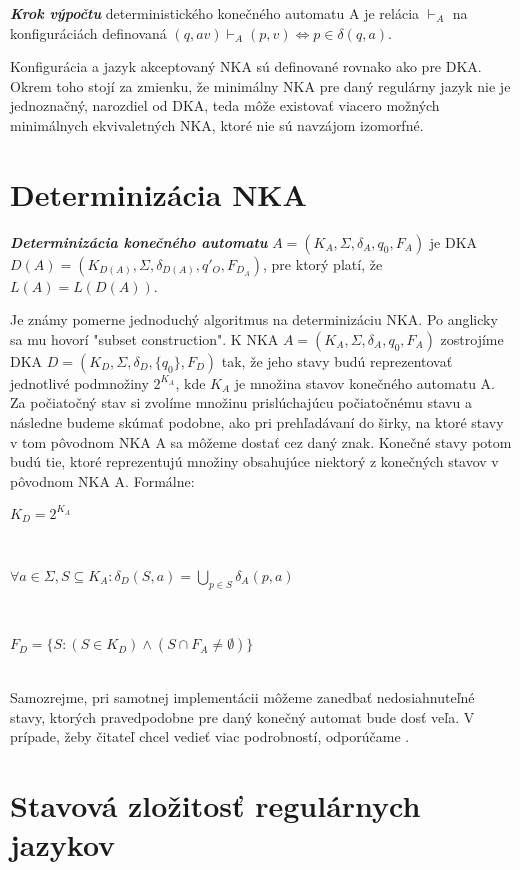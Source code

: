\begin{defn}{\textbf {\textit {Krok výpočtu}}} deterministického konečného automatu A je relácia $\vdash_A$ na konfiguráciách definovaná $(q,av)\vdash_A(p,v) \Longleftrightarrow p \in \delta(q,a)$.\end{defn}

Konfigurácia a jazyk akceptovaný NKA sú definované rovnako ako pre DKA. Okrem toho stojí za zmienku, že minimálny NKA pre daný regulárny jazyk nie je jednoznačný, narozdiel od DKA, teda môže existovať viacero možných minimálnych ekvivaletných NKA, ktoré nie sú navzájom izomorfné.


\section{Determinizácia NKA}

\begin{defn}{\textbf {\textit {Determinizácia konečného automatu}}} $A = (K_A,\Sigma,\delta_A,q_{0},F_A)$ je DKA $D(A) = (K_{D(A)},\Sigma,\delta_{D(A)},q'_{O},F_{D_A})$, pre ktorý platí, že $L(A) = L(D(A))$.
\end{defn}

Je známy pomerne jednoduchý algoritmus na determinizáciu NKA. Po anglicky sa mu hovorí "subset construction". K NKA $A = (K_A,\Sigma,\delta_A,q_0,F_A)$ zostrojíme DKA $D = (K_D,\Sigma,\delta_D,\{q_0\},F_D)$ tak, že jeho stavy budú reprezentovať jednotlivé podmnožiny $2^{K_A}$, kde $K_A$ je množina stavov konečného automatu A. Za počiatočný stav si zvolíme množinu prislúchajúcu počiatočnému stavu a následne budeme skúmať podobne, ako pri prehľadávaní do širky, na ktoré stavy v tom pôvodnom NKA A sa môžeme dostať cez daný znak. Konečné stavy potom budú tie, ktoré reprezentujú množiny obsahujúce niektorý z konečných stavov v pôvodnom NKA A. Formálne: 
\\
\centerline {$K_D = 2^{K_A}$}
\\
\centerline {$\forall a \in \Sigma, S \subseteq K_A: \delta_D(S,a) = {\bigcup}_{p \in S} \delta_A(p,a)$}
\\
\centerline {$F_D = \{S: (S \in K_D) \wedge (S \cap F_A \neq \emptyset)\}$}
\\
Samozrejme, pri samotnej implementácii môžeme zanedbať nedosiahnuteľné stavy, ktorých pravedpodobne pre daný konečný automat bude dosť veľa. V prípade, žeby čitateľ chcel vedieť viac podrobností, odporúčame \cite[Kapitola 2.3.5]{hopcroft}.


\section{Stavová zložitosť regulárnych jazykov}

